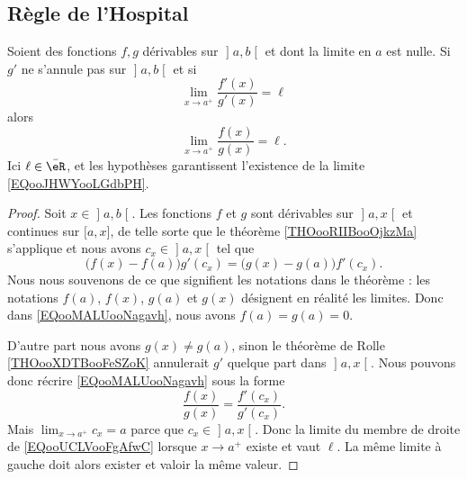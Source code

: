 \subsection{Règle de l'Hospital}

\begin{proposition}
Soient des fonctions \( f,g\) dérivables sur \( \mathopen] a , b \mathclose[\) et dont la limite en \( a\) est nulle. Si \( g'\) ne s'annule pas sur \( \mathopen] a , b \mathclose[\) et si
    \begin{equation}
        \lim_{x\to a^+} \frac{ f'(x) }{ g'(x) }=\ell
    \end{equation}
    alors 
    \begin{equation}        \label{EQooJHWYooLGdbPH}
        \lim_{x\to a^+} \frac{ f(x) }{ g(x) }=\ell.
    \end{equation}
    Ici \( \ell\in \bar \eR\), et les hypothèses garantissent l'existence de la limite \eqref{EQooJHWYooLGdbPH}.
\end{proposition}

\begin{proof}
Soit \( x\in\mathopen] a , b \mathclose[\). Les fonctions \( f\) et \( g\) sont dérivables sur \( \mathopen] a , x \mathclose[\) et continues sur \( \mathopen[ a , x \mathclose]\), de telle sorte que le théorème \ref{THOooRIIBooOjkzMa} s'applique et nous avons \( c_x\in \mathopen] a , x \mathclose[\) tel que
    \begin{equation}        \label{EQooMALUooNagavh}
        \big( f(x)-f(a) \big)g'(c_x)=\big( g(x)-g(a) \big)f'(c_x).
    \end{equation}
    Nous nous souvenons de ce que signifient les notations dans le théorème : les notations \( f(a)\), \( f(x)\), \( g(a)\) et \( g(x)\) désignent en réalité les limites. Donc dans \eqref{EQooMALUooNagavh}, nous avons \( f(a)=g(a)=0\).

D'autre part nous avons \( g(x)\neq g(a)\), sinon le théorème de Rolle \ref{THOooXDTBooFeSZoK} annulerait \( g'\) quelque part dans \( \mathopen] a , x \mathclose[\). Nous pouvons donc récrire \eqref{EQooMALUooNagavh} sous la forme
    \begin{equation}        \label{EQooUCLVooFgAfwC}
        \frac{ f(x) }{ g(x) }=\frac{ f'(c_x) }{ g'(c_x) }.
    \end{equation}
Mais \( \lim_{x\to a^+} c_x=a\) parce que \( c_x\in\mathopen] a , x \mathclose[\). Donc la limite du membre de droite de \eqref{EQooUCLVooFgAfwC} lorsque \( x\to a^+\) existe et vaut \( \ell\). La même limite à gauche doit alors exister et valoir la même valeur.
\end{proof}

